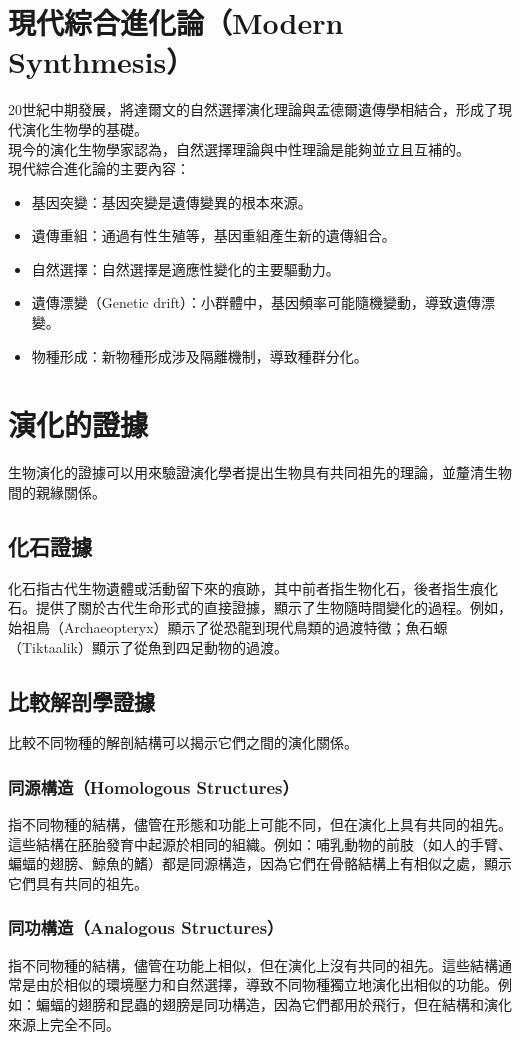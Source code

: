 \documentclass[a4paper,12pt]{report}
\begin{document}
\section{現代綜合進化論（Modern Synthmesis）}
20世紀中期發展，將達爾文的自然選擇演化理論與孟德爾遺傳學相結合，形成了現代演化生物學的基礎。\\
現今的演化生物學家認為，自然選擇理論與中性理論是能夠並立且互補的。\\
現代綜合進化論的主要內容：
\begin{itemize}
\item 基因突變：基因突變是遺傳變異的根本來源。
\item 遺傳重組：通過有性生殖等，基因重組產生新的遺傳組合。
\item 自然選擇：自然選擇是適應性變化的主要驅動力。
\item 遺傳漂變（Genetic drift）：小群體中，基因頻率可能隨機變動，導致遺傳漂變。
\item 物種形成：新物種形成涉及隔離機制，導致種群分化。
\end{itemize}
\section{演化的證據}
生物演化的證據可以用來驗證演化學者提出生物具有共同祖先的理論，並釐清生物間的親緣關係。
\subsection{化石證據}
化石指古代生物遺體或活動留下來的痕跡，其中前者指生物化石，後者指生痕化石。提供了關於古代生命形式的直接證據，顯示了生物隨時間變化的過程。例如，始祖鳥（Archaeopteryx）顯示了從恐龍到現代鳥類的過渡特徵；魚石螈（Tiktaalik）顯示了從魚到四足動物的過渡。
\subsection{比較解剖學證據}
比較不同物種的解剖結構可以揭示它們之間的演化關係。
\subsubsection{同源構造（Homologous Structures）}
指不同物種的結構，儘管在形態和功能上可能不同，但在演化上具有共同的祖先。這些結構在胚胎發育中起源於相同的組織。例如：哺乳動物的前肢（如人的手臂、蝙蝠的翅膀、鯨魚的鰭）都是同源構造，因為它們在骨骼結構上有相似之處，顯示它們具有共同的祖先。
\subsubsection{同功構造（Analogous Structures）}
指不同物種的結構，儘管在功能上相似，但在演化上沒有共同的祖先。這些結構通常是由於相似的環境壓力和自然選擇，導致不同物種獨立地演化出相似的功能。例如：蝙蝠的翅膀和昆蟲的翅膀是同功構造，因為它們都用於飛行，但在結構和演化來源上完全不同。
\end{document}
